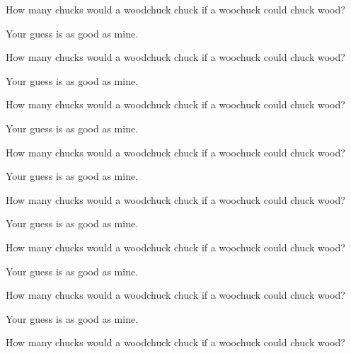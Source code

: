 \documentclass[12pt]{article}
\newenvironment{question}[2][Q]{\begin{trivlist}
\item[\hskip \labelsep {\bfseries #1}\hskip \labelsep {\bfseries #2.}]}{\end{trivlist}}
\newenvironment{answer}[2][A]{\begin{trivlist}
\item[\hskip \labelsep {\bfseries #1}\hskip \labelsep {\bfseries #2.}]}{\end{trivlist}}
\begin{document}
\begin{question}{11}
  How many chucks would a woodchuck chuck if a woochuck could chuck wood?
\end{question}

\begin{answer}{11}
Your guess is as good as mine.
\end{answer}
\begin{question}{12}
  How many chucks would a woodchuck chuck if a woochuck could chuck wood?
\end{question}

\begin{answer}{12}
Your guess is as good as mine.
\end{answer}

\begin{question}{13}
  How many chucks would a woodchuck chuck if a woochuck could chuck wood?
\end{question}

\begin{answer}{13}
Your guess is as good as mine.
\end{answer}
\begin{question}{14}
  How many chucks would a woodchuck chuck if a woochuck could chuck wood?
\end{question}

\begin{answer}{14}
Your guess is as good as mine.
\end{answer}
\begin{question}{15}
  How many chucks would a woodchuck chuck if a woochuck could chuck wood?
\end{question}

\begin{answer}{15}
Your guess is as good as mine.
\end{answer}
\begin{question}{16}
  How many chucks would a woodchuck chuck if a woochuck could chuck wood?
\end{question}

\begin{answer}{16}
Your guess is as good as mine.
\end{answer}
\begin{question}{17}
  How many chucks would a woodchuck chuck if a woochuck could chuck wood?
\end{question}

\begin{answer}{17}
Your guess is as good as mine.
\end{answer}
\begin{question}{18}
  How many chucks would a woodchuck chuck if a woochuck could chuck wood?
\end{question}
\end{document}
